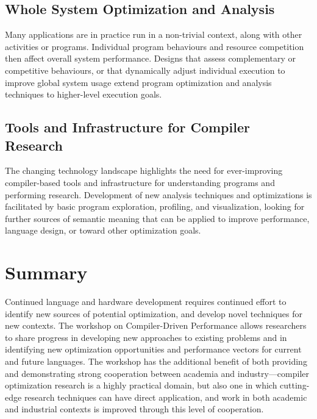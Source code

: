 \documentclass[sigconf]{acmart}
\begin{document}
\subsection{Whole System Optimization and Analysis}

Many applications are in practice run in a non-trivial context, along with other activities or programs. Individual program behaviours and resource competition then affect overall system performance. Designs that assess complementary or competitive behaviours, or that dynamically adjust individual execution to improve global system usage extend program optimization and analysis techniques to higher-level execution goals.

\subsection{Tools and Infrastructure for Compiler Research}

The changing technology landscape highlights the need for ever-improving compiler-based tools and infrastructure for understanding programs and performing research. Development of new analysis techniques and optimizations is facilitated by basic program exploration, profiling, and visualization, looking for further sources of semantic meaning that can be applied to improve performance, language design, or toward other optimization goals. 

\section{Summary}
Continued language and hardware development requires continued effort to identify new sources of potential optimization, and develop novel techniques for new contexts. The workshop on Compiler-Driven Performance allows researchers to share progress in developing new approaches to existing problems and in identifying new optimization opportunities and performance vectors for current and future languages. The workshop has the additional benefit of both providing and demonstrating strong cooperation between academia and industry---compiler optimization research is a highly practical domain, but also one in which cutting-edge research techniques can have direct application, and work in both academic and industrial contexts is improved through this level of cooperation.
\end{document}
